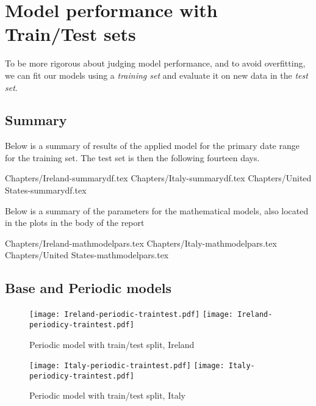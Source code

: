 \section{Model performance with Train/Test sets}
\label{ch:traintest}

To be more rigorous about judging model performance, and to avoid overfitting, we can fit our models using a \textit{training set} and evaluate it on new data in the \textit{test set}.

\subsection{Summary}
Below is a summary of results of the applied model for the primary date range for the training set. The test set is then the following fourteen days.

{Chapters/Ireland-summarydf.tex}
{Chapters/Italy-summarydf.tex}
{Chapters/United States-summarydf.tex}

Below is a summary of the parameters for the mathematical models, also located in the plots in the body of the report

{Chapters/Ireland-mathmodelpars.tex}
{Chapters/Italy-mathmodelpars.tex}
{Chapters/United States-mathmodelpars.tex}

\subsection{Base and Periodic models}
\begin{figure}[H]
  \texttt{[image: Ireland-periodic-traintest.pdf]} \label{fig:ireland-periodic-traintest}
\endminipage\hfill
{}
  \texttt{[image: Ireland-periodicy-traintest.pdf]} \label{fig:ireland-periodicy-traintest}
\endminipage
\caption{Periodic model with train/test split, Ireland}
\end{figure}

\begin{figure}[H]
  \texttt{[image: Italy-periodic-traintest.pdf]} \label{fig:italy-periodic-traintest}
\endminipage\hfill
{}
  \texttt{[image: Italy-periodicy-traintest.pdf]} \label{fig:italy-periodicy-traintest}
\endminipage
\caption{Periodic model with train/test split, Italy}
\end{figure}

